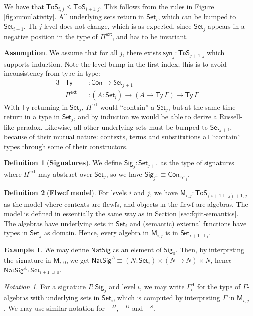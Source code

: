 \documentclass[12pt,a4paper,twoside,openany]{book}
\theoremstyle{remark}
\newtheorem{notation}{Notation}
\theoremstyle{definition}
\newtheorem{mydefinition}{Definition}
\newtheorem{myexample}{Example}
\theoremstyle{theorem}
\newcommand{\ms}[1]{\mathsf{#1}}
\newcommand{\bs}[1]{\boldsymbol{#1}}
\newcommand{\Con}{\mathsf{Con}}
\newcommand{\Ty}{\mathsf{Ty}}
\newcommand{\blank}{\mathord{\hspace{1pt}\text{--}\hspace{1pt}}}
\newcommand{\Set}{\mathsf{Set}}
\newcommand{\ToS}{\mathsf{ToS}}
\newcommand{\Pie}{\Pi^{\mathsf{ext}}}
\newcommand{\Sig}{\mathsf{Sig}}
\newcommand{\syn}{\mathsf{syn}}
\newcommand{\bM}{\bs{\mathsf{M}}}
\newcommand{\defn}{:\equiv}
\newcommand{\lub}{\,\sqcup\,}
\begin{document}
We have that $\ToS_{i,j} \leq \ToS_{i+1,j}$. This follows from the rules
in Figure \ref{fig:cumulativity}. All underlying sets return in $\Set_i$, which
can be bumped to $\Set_{i + 1}$.  Th $j$ level does not change, which is as
expected, since $\Set_j$ appears in a negative position in the type of $\Pie$,
and has to be invariant.

\textbf{Assumption.}
We assume that for all $j$, there exists $\syn_j : \ToS_{j+1,j}$ which supports
induction. Note the level bump in the first index; this is to avoid
inconsistency from type-in-type:
\begin{alignat*}{3}
  &\Ty &&: \Con \to \Set_{j+1}\\ &\Pie &&: (A : \Set_j) \to (A \to \Ty\,\Gamma)
  \to \Ty\,\Gamma
\end{alignat*}
With $\Ty$ returning in $\Set_j$, $\Pie$ would ``contain'' a $\Set_j$, but at
the same time return in a type in $\Set_j$, and by induction we would be able to
derive a Russell-like paradox. Likewise, all other underlying sets
must be bumped to $\Set_{j+1}$, because of their mutual nature: contexts, terms
and substitutions all ``contain'' types through some of their constructors.

\begin{mydefinition}[\textbf{Signatures}]
We define $\Sig_j : \Set_{j+1}$ as the type of signatures where $\Pie$ may
abstract over $\Set_j$, so we have $\Sig_j \defn \Con_{\syn_j}$.
\end{mydefinition}

\begin{mydefinition}[\textbf{Flwcf model}]
For levels $i$ and $j$, we have $\bM_{i,j} : \ToS_{(i+1\lub j)+1,j}$ as the
model where contexts are flcwfs, and objects in the flcwf are algebras.  The
model is defined in essentially the same way as in Section
\ref{sec:fqiit-semantics}. The algebras have underlying sets in $\Set_i$ and
(semantic) external functions have types in $\Set_j$ as domain. Hence, every
algebra in $\bM_{i,j}$ is in $\Set_{i+1\lub j}$.
\end{mydefinition}

\begin{myexample}
We may define $\ms{NatSig}$ as an element of $\Sig_0$. Then, by interpreting the
signature in $\bM_{i,0}$, we get $\ms{NatSig}^A \equiv (N : \Set_i) \times (N
\to N) \times N$, hence $\ms{NatSig}^A : \Set_{i + 1 \lub 0}$.
\end{myexample}

\begin{notation}
For a signature $\Gamma : \Sig_j$ and level $i$, we may write $\Gamma^A_i$ for
the type of $\Gamma$-algebras with underlying sets in $\Set_i$, which is
computed by interpreting $\Gamma$ in $\bM_{i,j}$. We may use similar notation
for $\blank^M$, $\blank^D$ and $\blank^S$.
\end{notation}
\end{document}
